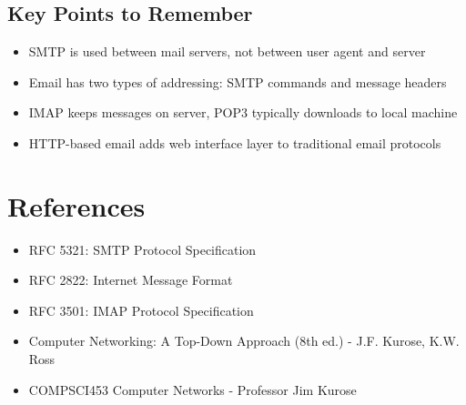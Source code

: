 \documentclass[12pt]{article}
\begin{document}
\subsection{Key Points to Remember}
\begin{itemize}
    \item SMTP is used between mail servers, not between user agent and server
    \item Email has two types of addressing: SMTP commands and message headers
    \item IMAP keeps messages on server, POP3 typically downloads to local machine
    \item HTTP-based email adds web interface layer to traditional email protocols
\end{itemize}

\section{References}
\begin{itemize}
    \item RFC 5321: SMTP Protocol Specification
    \item RFC 2822: Internet Message Format
    \item RFC 3501: IMAP Protocol Specification
    \item Computer Networking: A Top-Down Approach (8th ed.) - J.F. Kurose, K.W. Ross
    \item COMPSCI453 Computer Networks - Professor Jim Kurose
\end{itemize}
\end{document}

